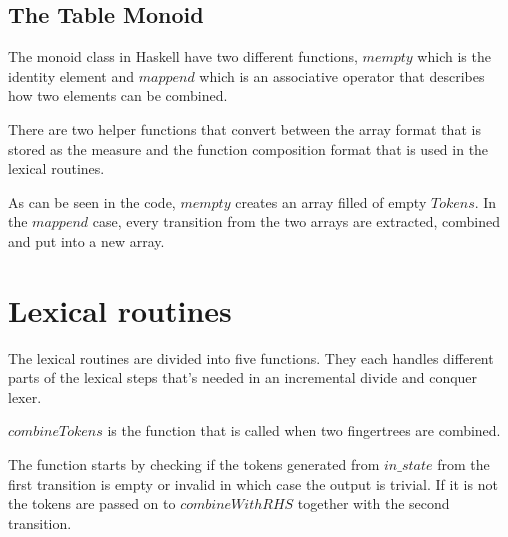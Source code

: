 \subsection{The Table Monoid}
The monoid class in Haskell have two different functions, $mempty$ which is the
identity element and $mappend$ which is an associative operator that describes how
two elements can be combined.

There are two helper functions that convert between the array format that is
stored as the measure and the function composition format that is used in the
lexical routines.

As can be seen in the code, $mempty$ creates an array filled of empty $Tokens$.
In the $mappend$ case, every transition from the two arrays are extracted,
combined and put into a new array.

\section{Lexical routines}
The lexical routines are divided into five functions. They each handles
different parts of the lexical steps that's needed in an incremental divide and
conquer lexer.


$combineTokens$ is the function that is called when two fingertrees are combined.

The function starts by checking if the tokens generated from $in\_state$ from
the first transition is empty or invalid in which case the output is trivial. If
it is not the tokens are passed on to $combineWithRHS$ together with the second
transition.

